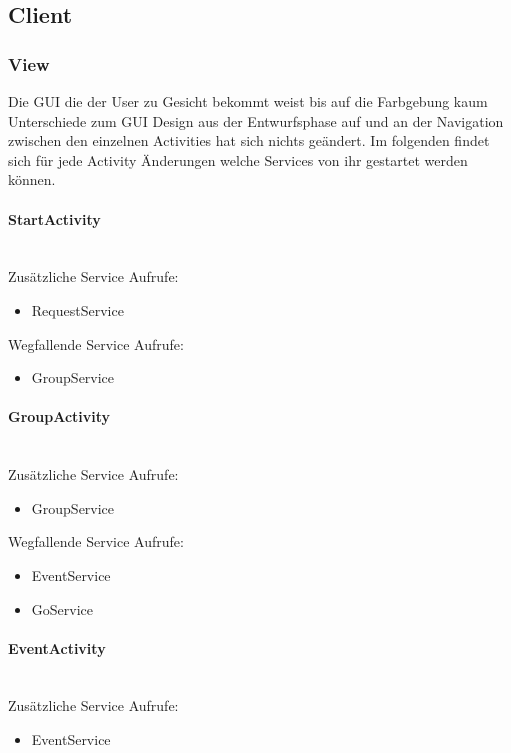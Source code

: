\documentclass{scrartcl}
\begin{document}
\subsection{Client}
	\subsubsection{View}
	Die GUI die der User zu Gesicht bekommt weist bis auf die Farbgebung kaum Unterschiede zum GUI Design aus der Entwurfsphase auf und an der Navigation zwischen den einzelnen Activities hat sich nichts geändert.
Im folgenden findet sich für jede Activity Änderungen welche Services von ihr gestartet werden können. 
	
	\paragraph{StartActivity}$~~$\\
	Zusätzliche Service Aufrufe:
	\begin{itemize}
	\item RequestService
	\end{itemize}
	Wegfallende Service Aufrufe:
	\begin{itemize}
	\item GroupService
	\end{itemize}

	\paragraph{GroupActivity}$~~$\\

	Zusätzliche Service Aufrufe:
	\begin{itemize}
	\item GroupService
	\end{itemize}
	Wegfallende Service Aufrufe:
	\begin{itemize}
	\item EventService
	\item GoService
	\end{itemize}

	\paragraph{EventActivity}$~~$\\

	Zusätzliche Service Aufrufe:
	\begin{itemize}
	\item EventService
	\end{itemize}
 
\end{document}
